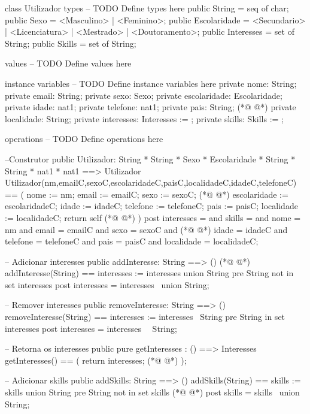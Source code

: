 \begin{vdmpp}[breaklines=true]
class Utilizador
types
-- TODO Define types here
 public String = seq of char;
 public Sexo = <Masculino> | <Feminino>;
 public Escolaridade = <Secundario> | <Licenciatura> | <Mestrado> | <Doutoramento>;
 public Interesses = set of String;
 public Skills = set of String;
 
values
-- TODO Define values here

instance variables
-- TODO Define instance variables here
 private nome: String;
 private email: String;
 private sexo: Sexo;
 private escolaridade: Escolaridade;
 private idade: nat1;
 private telefone: nat1;
 private pais: String;
(*@
\label{Utilizador:22}
@*)
 private localidade: String;
 private interesses: Interesses := {};
 private skills: Skills := {};
 
operations
-- TODO Define operations here

 --Construtor
 public Utilizador: String * String * Sexo * Escolaridade * String * String * nat1 * nat1 ==> Utilizador
 Utilizador(nm,emailC,sexoC,escolaridadeC,paisC,localidadeC,idadeC,telefoneC) == (
  nome := nm;
  email := emailC;
  sexo := sexoC;
(*@
\label{addInteresse:35}
@*)
  escolaridade := escolaridadeC;
  idade := idadeC;
  telefone := telefoneC;
  pais := paisC;
  localidade := localidadeC;
  return self
(*@
\label{removeInteresse:41}
@*)
 )
 post interesses = {} and
   skills = {} and
   nome = nm and
   email = emailC and
   sexo = sexoC and
(*@
\label{getInteresses:47}
@*)
   idade = idadeC and
   telefone = telefoneC and
   pais = paisC and
   localidade = localidadeC;
 
 -- Adicionar interesses
 public addInteresse: String ==> ()
(*@
\label{getNome:54}
@*)
 addInteresse(String) == interesses := interesses union {String}
 pre String not in set interesses
 post interesses = interesses~ union {String};
 
 -- Remover interesses
 public removeInteresse: String ==> ()
 removeInteresse(String) == interesses := interesses \ {String}
 pre String in set interesses
 post interesses = interesses~ \ {String};
 
 -- Retorna os interesses
 public pure getInteresses : () ==> Interesses
 getInteresses() ==
 (
  return interesses;
(*@
\label{addSkills:69}
@*)
 );
 
 -- Adicionar skills
 public addSkills: String ==> ()
 addSkills(String) == skills := skills union {String}
 pre String not in set skills
(*@
\label{removeSkills:75}
@*)
 post skills = skills~ union {String};
 

\end{vdmpp}
